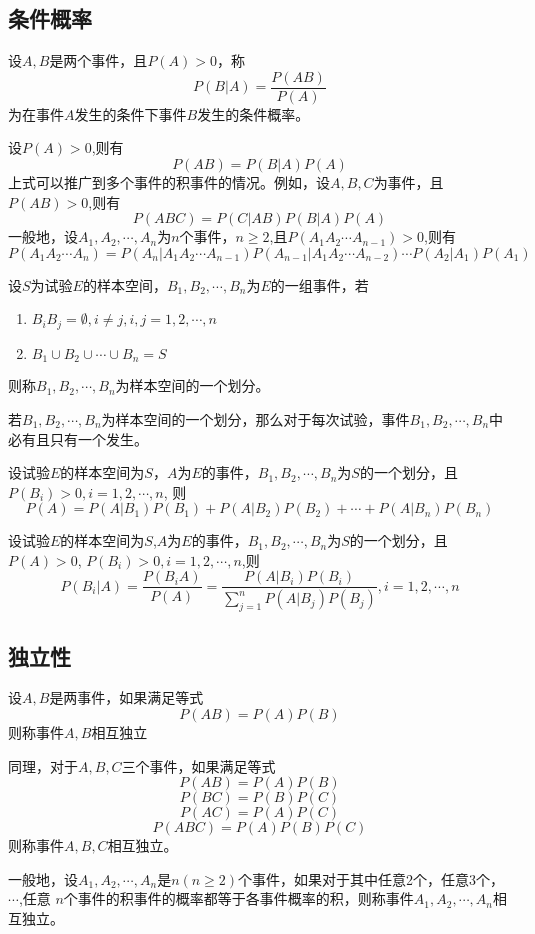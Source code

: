\subsection{条件概率}
\begin{definition}[条件概率]
  设$A,B$是两个事件，且$P(A)>0$，称
  $$P(B|A)=\frac{P(AB)}{P(A)}$$
  为在事件$A$发生的条件下事件$B$发生的条件概率。
\end{definition}

\begin{theorem}[乘法定理]
  设$P(A)>0$,则有
  $$P(AB)=P(B|A)P(A)$$
  上式可以推广到多个事件的积事件的情况。例如，设$A,B,C$为事件，且$P(AB)>0$,则有
  $$P(ABC)=P(C|AB)P(B|A)P(A)$$
  一般地，设$A_1,A_2,\cdots,A_n$为$n$个事件，$n\geq 2$,且$P(A_1A_2\cdots A_{n-1})>0$,则有
  $$P(A_1A_2\cdots A_n)=P(A_n|A_1A_2\cdots A_{n-1})P(A_{n-1}|A_1A_2\cdots A_{n-2})\cdots P(A_2|A_1)P(A_1)$$
\end{theorem}

\begin{definition}[样本空间的划分]
  设$S$为试验$E$的样本空间，$B_1,B_2,\cdots,B_n$为$E$的一组事件，若
  \begin{enumerate}
    \item $B_iB_j=\emptyset,i\neq j,i,j=1,2,\cdots,n$
    \item $B_1\cup B_2\cup\cdots\cup B_n=S$
  \end{enumerate}
  则称$B_1,B_2,\cdots,B_n$为样本空间的一个划分。

  若$B_1,B_2,\cdots,B_n$为样本空间的一个划分，那么对于每次试验，事件$B_1,B_2,\cdots,B_n$中必有且只有一个发生。
\end{definition}

\begin{theorem}[全概率公式]
  设试验$E$的样本空间为$S$，$A$为$E$的事件，$B_1,B_2,\cdots,B_n$为$S$的一个划分，且$P(B_i)>0,i=1,2,\cdots,n$,
  则
  $$P(A)=P(A|B_1)P(B_1)+P(A|B_2)P(B_2)+\cdots+P(A|B_n)P(B_n)$$
\end{theorem}

\begin{theorem}
  设试验$E$的样本空间为$S$,$A$为$E$的事件，$B_1,B_2,\cdots,B_n$为$S$的一个划分，且$P(A)>0$,
  $P(B_i)>0,i=1,2,\cdots,n$,则
  $$P(B_i|A)=\frac{P(B_iA)}{P(A)}=\frac{P(A|B_i)P(B_i)}{\sum\limits_{j=1}^{n} P(A|B_j)P(B_j)},i=1,2,\cdots,n$$ 
\end{theorem}

\subsection{独立性}
\begin{definition}[独立性]
  设$A,B$是两事件，如果满足等式
  $$P(AB)=P(A)P(B)$$
  则称事件$A,B$相互独立

  同理，对于$A,B,C$三个事件，如果满足等式
  $$P(AB)=P(A)P(B)$$
  $$P(BC)=P(B)P(C)$$
  $$P(AC)=P(A)P(C)$$
  $$P(ABC)=P(A)P(B)P(C)$$
  则称事件$A,B,C$相互独立。

  一般地，设$A_1,A_2,\cdots,A_n$是$n(n\geq 2)$个事件，如果对于其中任意2个，任意3个，$\cdots$,任意
  $n$个事件的积事件的概率都等于各事件概率的积，则称事件$A_1,A_2,\cdots,A_n$相互独立。
\end{definition}

